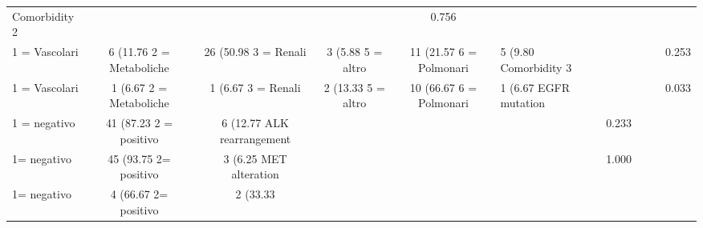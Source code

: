 \begin{table}[!ht]
\begin{tabular}{lcccc}
Comorbidity 2 & & & & 0.756 \\
\hspace{3mm} 1 = Vascolari & 6 (11.76%
\hspace{3mm} 2 = Metaboliche & 26 (50.98%
\hspace{3mm} 3 = Renali & 3 (5.88%
\hspace{3mm} 5 = altro & 11 (21.57%
\hspace{3mm} 6 = Polmonari & 5 (9.80%
Comorbidity 3 & & & & 0.253 \\
\hspace{3mm} 1 = Vascolari & 1 (6.67%
\hspace{3mm} 2 = Metaboliche & 1 (6.67%
\hspace{3mm} 3 = Renali & 2 (13.33%
\hspace{3mm} 5 = altro & 10 (66.67%
\hspace{3mm} 6 = Polmonari & 1 (6.67%
EGFR mutation & & & & 0.033 \\
\hspace{3mm} 1 = negativo & 41 (87.23%
\hspace{3mm} 2 = positivo & 6 (12.77%
ALK rearrangement & & & & 0.233 \\
\hspace{3mm} 1= negativo & 45 (93.75%
\hspace{3mm} 2= positivo & 3 (6.25%
MET alteration & & & & 1.000 \\
\hspace{3mm} 1= negativo & 4 (66.67%
\hspace{3mm} 2= positivo & 2 (33.33%

\end{tabular}
\end{table}
